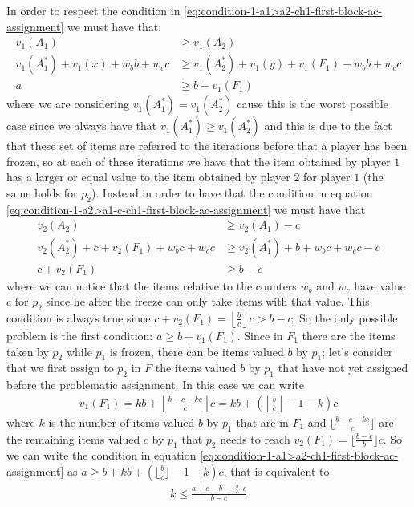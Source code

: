In order to respect the condition in \ref{eq:condition-1-a1>a2-ch1-first-block-ac-assignment} we must have that:
\begin{align*}
    v_1(A_1) &\ge v_1(A_2)\\
    v_1(A_1^*) + v_1(x) + w_b b + w_c c &\ge  v_1(A_2^*) + v_1(y) + v_1(F_1)+ w_b b + w_c c \\
    a  &\ge  b + v_1(F_1)
\end{align*}
where we are considering $v_1(A_1^*) = v_1(A_2^*)$ cause this is the worst possible case since we always have that $v_1(A_1^*) \ge v_1(A_2^*)$ and this is due to the fact that these set of items are referred to the iterations before that a player has been frozen, so at each of these iterations we have that the item obtained by player $1$ has a larger or equal value to the item obtained by player $2$ for player $1$ (the same holds for $p_2$).
Instead in order to have that the condition in equation \ref{eq:condition-1-a2>a1-c-ch1-first-block-ac-assignment} we must have that
\begin{align*}
    v_2(A_2) &\ge v_2(A_1) -c\\
    v_2(A_2^*) + c + v_2(F_1)+ w_b c + w_c c &\ge v_2(A_1^*) + b + w_b c + w_c c - c\\
    c  + v_2(F_1)&\ge  b - c 
\end{align*}
where we can notice that the items relative to the counters $w_b$ and $w_c$ have value $c$ for $p_2$ since he after the freeze can only take items with that value.
This condition is always true since $ c  + v_2(F_1) =\left \lfloor \frac{b}{c}\right\rfloor c > b-c$. So the only possible problem is the first condition: $a \ge  b + v_1(F_1)$. Since in $F_1$ there are the items taken by $p_2$ while $p_1$ is frozen, there can be items valued $b$ by $p_1$; let's consider that we first assign to $p_2$ in $F$ the items valued $b$ by $p_1$ that have not yet assigned before the problematic assignment. In this case we can write
\begin{align*}
    v_1(F_1) = kb + \left\lfloor \frac{b-c-kc}{c}\right\rfloor c = kb + (\left\lfloor \frac{b}{c}\right\rfloor -1-k)c
\end{align*}
where $k$ is the number of items valued $b$ by $p_1$ that are in $F_1$ and $\lfloor \frac{b-c-kc}{c}\rfloor$ are the remaining items valued $c$ by $p_1$ that $p_2$ needs to reach $v_2(F_1)  = \lfloor \frac{b-c}{b}\rfloor c$. So we can write the condition in equation \ref{eq:condition-1-a1>a2-ch1-first-block-ac-assignment} as $a \ge b +kb + (\lfloor \frac{b}{c}\rfloor -1-k)c $, that is equivalent to 
\begin{align}
    k \le \frac{a + c - b - \lfloor \frac{b}{c}\rfloor c }{b-c}
    \label{eq:condition-1-a1>a2-ch1-first-block-ac-assignment-on-k}
\end{align}

